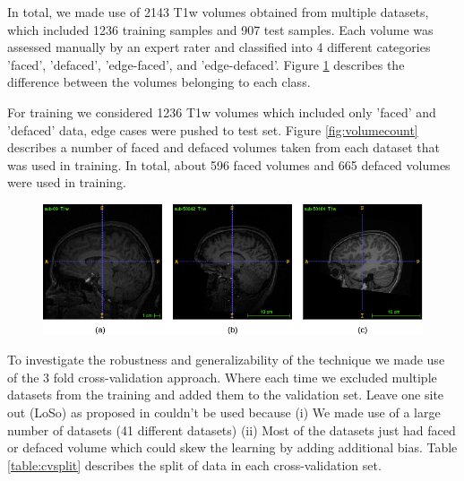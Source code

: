 \documentclass[runningheads]{llncs}
\begin{document}
In total, we made use of 2143 T1w volumes obtained from multiple datasets, which included 1236 training samples and 907 test samples. Each volume was assessed manually by an expert rater and classified into 4 different categories 'faced', 'defaced', 'edge-faced', and 'edge-defaced'. Figure \ref{fig:data} describes the difference between the volumes belonging to each class.

For training we considered 1236 T1w volumes which included only 'faced' and 'defaced' data, edge cases were pushed to test set. Figure \ref{fig:volumecount} describes a number of faced and defaced volumes taken from each dataset that was used in training. In total, about 596 faced volumes and 665 defaced volumes were used in training.

\begin{figure}
 \centering
 \label{fig:data}
 \includegraphics[width=1\textwidth]{images/data.png}
 \caption{}
\end{figure}


To investigate the robustness and generalizability of the technique we made use of the 3 fold cross-validation approach. Where each time we excluded multiple datasets from the training and added them to the validation set. Leave one site out (LoSo) as proposed in \cite{} couldn't be used because (i) We made use of a large number of datasets (41 different datasets) (ii) Most of the datasets just had faced or defaced volume which could skew the learning by adding additional bias. Table \ref{table:cvsplit} describes the split of data in each cross-validation set.  
\end{document}
